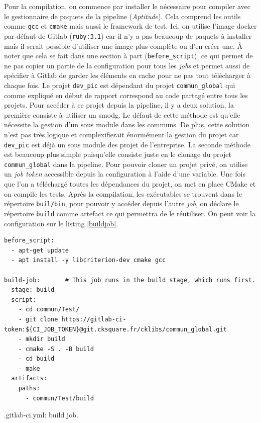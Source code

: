 \documentclass[a4paper]{article}
\begin{document}
Pour la compilation, on commence par installer le nécessaire pour compiler avec
le gestionnaire de paquets de la pipeline (\textit{Aptitude}). Cela comprend les
outils comme \verb|gcc| et \verb|cmake| mais aussi le framework de test. Ici, on
utilise l'image docker par défaut de Gitlab (\verb|ruby:3.1|) car il n'y a pas
beaucoup de paquets à installer mais il serait possible d'utiliser une image
plus complète ou d'en créer une. À noter que cela se fait dans une section à
part (\verb|before_script|), ce qui permet de ne pas copier un partie de la
configuration pour tous les \textit{jobs} et permet aussi de spécifier à Gitlab
de garder les éléments en cache pour ne pas tout télécharger à chaque fois. Le
projet \verb|dev_pic| est dépendant du projet \verb|commun_global| qui comme
expliqué en début de rapport correspond au code partagé entre tous les projets.
Pour accéder à ce projet depuis la pipeline, il y a deux solution, la première
consiste à utiliser un \gls{smodg}. Le défaut de cette méthode est qu'elle
nécessite la gestion d'un sous module dans les communs. De plus, cette solution
n'est pas très logique et complexifierait énormément la gestion du projet car
\verb|dev_pic| est déjà un sous module des projet de l'entreprise. La seconde
méthode est beaucoup plus simple puisqu'elle consiste juste en le clonage du
projet \verb|commun_global| dans la pipeline. Pour pouvoir cloner un projet
privé, on utilise un \textit{job token} accessible depuis la configuration à
l'aide d'une variable. Une fois que l'on a téléchargé toutes les dépendances du
projet, on met en place CMake et on compile les tests. Après la compilation, les
exécutables se trouvent dans le répertoire \verb|buil/bin|, pour pouvoir y
accéder depuis l'autre \textit{job}, on déclare le répertoire \verb|build| comme
artefact ce qui permettra de le réutiliser. On peut voir la configuration sur le
listing \ref{buildjob}.

\begin{listing}[ht!]
\begin{verbatim}
before_script:
  - apt-get update
  - apt install -y libcriterion-dev cmake gcc

build-job:       # This job runs in the build stage, which runs first.
  stage: build
  script:
    - cd commun/Test/
    - git clone https://gitlab-ci-token:${CI_JOB_TOKEN}@git.cksquare.fr/cklibs/commun_global.git
    - mkdir build
    - cmake -S . -B build
    - cd build
    - make
  artifacts:
    paths:
      - commun/Test/build
\end{verbatim}
\caption{.gitlab-ci.yml: build job.}
\label{buildjob}
\end{listing}
\end{document}

